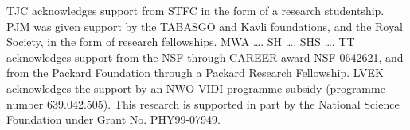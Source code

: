 TJC acknowledges support from STFC in the form of a research studentship.
%
PJM was given support by the TABASGO and Kavli foundations, and the Royal 
Society, in the form of research fellowships.
%
MWA \ldots. SH \ldots. SHS \ldots.
%
TT acknowledges support from the NSF through CAREER award NSF-0642621,
and from the Packard Foundation through a Packard Research Fellowship.
% 
LVEK acknowledges the support by an NWO-VIDI programme subsidy
(programme number 639.042.505).
%
This research is supported in part by the National Science Foundation under
Grant No. PHY99-07949.

